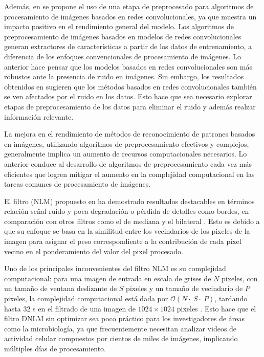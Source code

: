 Además, en \cite{CNN_DNLM} se propone el uso de una etapa de preprocesado para algoritmos de procesamiento de imágenes basados en redes convolucionales, ya que muestra un impacto positivo en el rendimiento general del modelo. Los algoritmos de preprocesamiento de imágenes basados en modelos de redes convolucionales generan extractores de características a partir de los datos de entrenamiento, a diferencia de los enfoques convencionales de procesamiento de imágenes. Lo anterior hace pensar que los modelos basados en redes convolucionales son más robustos ante la presencia de ruido en imágenes. Sin embargo, los resultados obtenidos en \cite{CNN_DNLM} sugieren que los métodos basados en redes convolucionales también se ven afectados por el ruido en los datos. Esto hace que sea necesario explorar etapas de preprocesamiento de los datos para eliminar el ruido y además realzar información relevante.

La mejora en el rendimiento de métodos de reconocimiento de patrones basados en imágenes, utilizando algoritmos de preprocesamiento efectivos y complejos, generalmente implica un aumento de recursos computacionales necesarios. Lo anterior conduce al desarrollo de algoritmos de preprocesamiento cada vez más eficientes que logren mitigar el aumento en la complejidad computacional en las tareas comunes de procesamiento de imágenes. 


El filtro  (NLM) propuesto en \cite{buades2005non} ha demostrado resultados destacables en términos relación se\~nal-ruido y poca degradación o pérdida de detalles como bordes, en comparación con otros filtros como el de mediana y el bilateral \cite{CONCAPAN2016}. Esto es debido a que su enfoque se basa en la similitud entre los vecindarios de los pixeles de la imagen para asignar el peso correspondiente a la contribución de cada pixel vecino en el ponderamiento del valor del pixel procesado. 

Uno de los principales inconvenientes del filtro NLM es su complejidad computacional: para una imagen de entrada en escala de grises de $N$ pixeles, con un tamaño de ventana deslizante de $S$ pixeles y un tamaño de vecindario de $P$ pixeles, la complejidad computacional está dada por $\mathcal{O}(N\cdot~S\cdot~P)$, tardando hasta $32$ s en el filtrado de una imagen de $1024 \times 1024$ pixeles \cite{Zhu2016}. Esto hace que el filtro DNLM sin optimizar sea poco práctico para los investigadores de áreas como la microbiología, ya que frecuentemente necesitan analizar videos de actividad celular compuestos por cientos de miles de imágenes, implicando múltiples días de procesamiento. 

